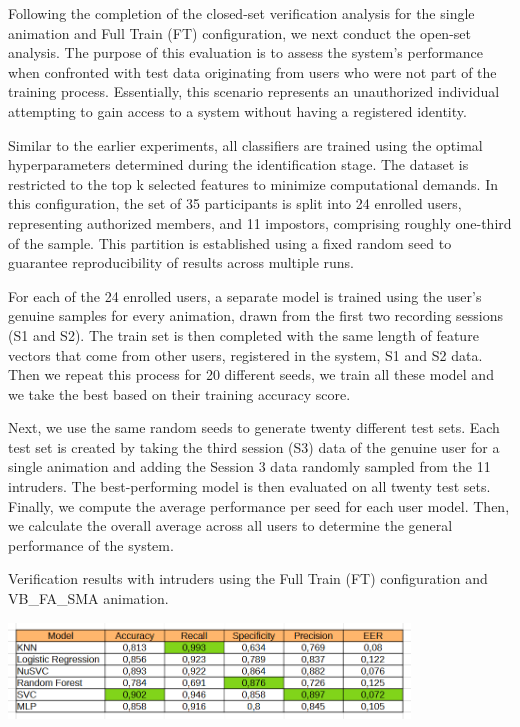 \documentclass[12pt]{report}
\begin{document}
Following the completion of the closed-set verification analysis for the single animation and Full Train (FT) configuration, we next conduct the open-set analysis. 
The purpose of this evaluation is to assess the system’s performance when confronted with test data originating from users who were not part of the training process. 
Essentially, this scenario represents an unauthorized individual attempting to gain access to a system without having a registered identity.

Similar to the earlier experiments, all classifiers are trained using the optimal hyperparameters determined during the identification stage. 
The dataset is restricted to the top k selected features to minimize computational demands. 
In this configuration, the set of 35 participants is split into 24 enrolled users, representing authorized members, and 11 impostors, comprising roughly one-third of the sample. 
This partition is established using a fixed random seed to guarantee reproducibility of results across multiple runs.

For each of the 24 enrolled users, a separate model is trained using the user’s genuine samples for every animation, drawn from the first two recording sessions (S1 and S2).
The train set is then completed with the same length of feature vectors that come from other users, registered in the system, S1 and S2 data.
Then we repeat this process for 20 different seeds, we train all these model and we take the best based on their training accuracy score.

Next, we use the same random seeds to generate twenty different test sets. 
Each test set is created by taking the third session (S3) data of the genuine user for a single animation and adding the Session 3 data randomly sampled from the 11 intruders.
The best-performing model is then evaluated on all twenty test sets. 
Finally, we compute the average performance per seed for each user model. 
Then, we calculate the overall average across all users to determine the general performance of the system.

\begin{table}[ht]
    \centering
    \caption{Verification results with intruders using the Full Train (FT) configuration and VB\_FA\_SMA animation.}
    \includegraphics[width=0.8\textwidth]{Images/Results/Verification_single_intruders/ft/VB_FA_LIT.png}
    \label{tab:VB_FA_LIT_fti}
\end{table}
\end{document}
